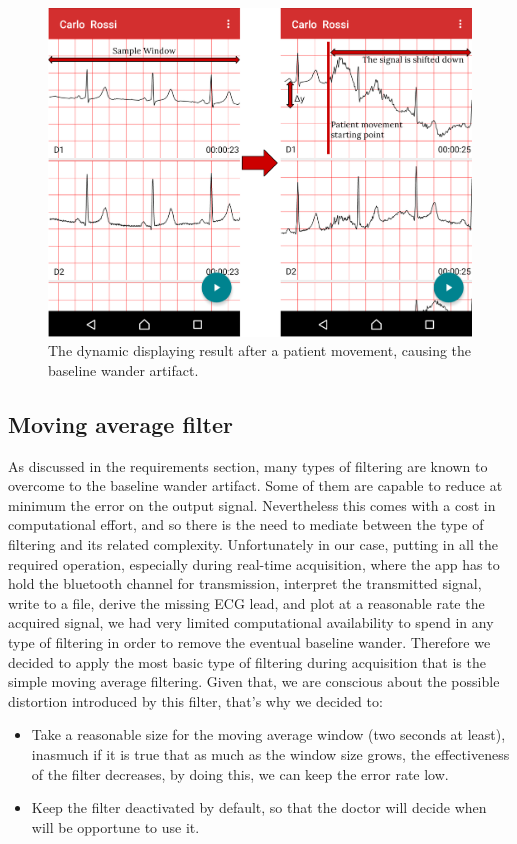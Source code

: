 \begin{figure}[ht!]
	\centering
	\includegraphics[width=130mm]{figures/ch7/4.png}
	\caption{The dynamic displaying result after a patient movement, causing the baseline wander artifact.}
	\label{fig7.4}
\end{figure}

\subsection{Moving average filter}
As discussed in the requirements section, many types of filtering are known to overcome to the baseline wander artifact. Some of them are capable to reduce at minimum the error on the output signal. Nevertheless this comes with a cost in computational effort, and so there is the need to mediate between the type of filtering and its related complexity.
Unfortunately in our case, putting in all the required operation, especially during real-time acquisition, where the app has to hold the bluetooth channel for transmission, interpret the transmitted signal, write to a file, derive the missing ECG lead, and plot at a reasonable rate the acquired signal, we had very limited computational availability to spend in any type of filtering in order to remove the eventual baseline wander. Therefore we decided to apply the most basic type of filtering during acquisition that is the simple moving average filtering. Given that, we are conscious about the possible distortion introduced by this filter, that's why we decided to:
\begin{itemize}
	\item Take a reasonable size for the moving average window (two seconds at least), inasmuch if it is true that as much as the window size grows, the effectiveness of the filter decreases, by doing this, we can keep the error rate low.
	\item Keep the filter deactivated by default, so that the doctor will decide when will be opportune to use it.
\end{itemize}

